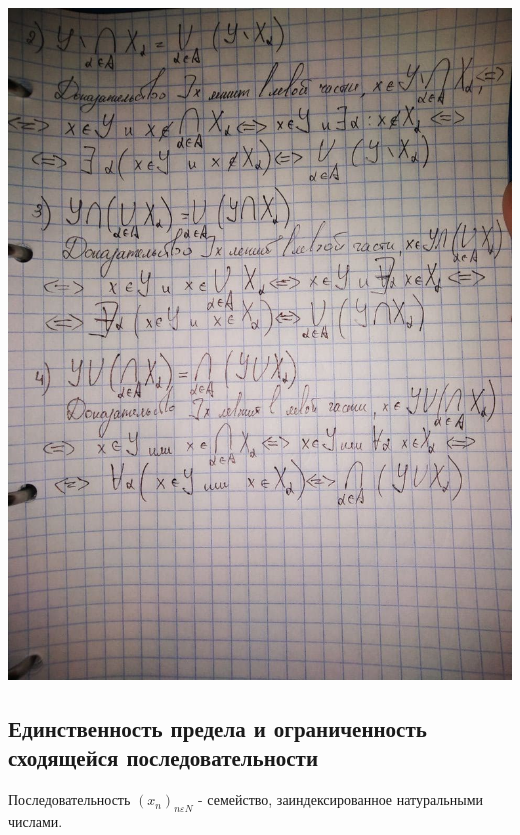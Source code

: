 \includegraphics[width =\textwidth, height = 0.8\textheight]{Images/доказательства де моргана.jpg}



\newpage
\subsection{Единственность предела и ограниченность сходящейся последовательности}
\begin{definition}
     Последовательность $ { ( {x_{n}} )_{n \varepsilon  {N} }}$ - семейство, заиндексированное натуральными числами.
\end{definition}

     
     
